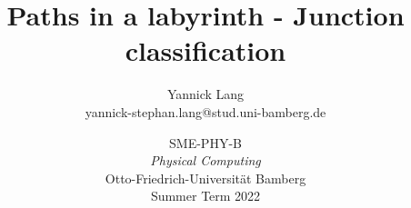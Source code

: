 \documentclass{article}
\title{Paths in a labyrinth - Junction classification}
\author{Yannick Lang\\
    \small yannick-stephan.lang@stud.uni-bamberg.de}
\date{ \vspace{0.5cm} \large 
  SME-PHY-B\\ 
  \emph{Physical Computing} \\ \vspace{0.2cm}
  Otto-Friedrich-Universität Bamberg \\ \vspace{0.2cm}
  Summer Term 2022}
\begin{document}
\newcommand{\IIC}{I\textsuperscript{2}C}

\maketitle













\printbibliography



\end{document}
